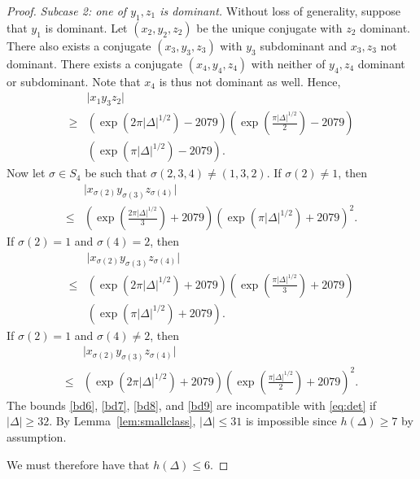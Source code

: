 \documentclass[11pt,a4paper, british]{amsart}
\theoremstyle{definition}
\theoremstyle{remark}
\numberwithin{equation}{section}
\begin{document}
\begin{proof}
\textit{Subcase 2: one of $y_1, z_1$ is dominant.} Without loss of generality, suppose that $y_1$ is dominant. Let $(x_2, y_2, z_2)$ be the unique conjugate with $z_2$ dominant. There also exists a conjugate $(x_3, y_3, z_3)$ with $y_3$ subdominant and $x_3, z_3$ not dominant. There exists a conjugate $(x_4, y_4, z_4)$ with neither of $y_4, z_4$ dominant or subdominant. Note that $x_4$ is thus not dominant as well. Hence,
\begin{align}\label{bd6}
	&\lvert x_1 y_3 z_2 \rvert \nonumber\\
	\geq &(\exp(2 \pi \lvert \Delta \rvert^{1/2}) - 2079)\left(\exp\left(\frac{\pi \lvert \Delta \rvert^{1/2}}{2}\right) - 2079\right) \nonumber \\
	&(\exp(\pi \lvert \Delta \rvert^{1/2}) - 2079).
\end{align}
Now let $\sigma \in S_4$ be such that $\sigma(2, 3, 4) \neq (1, 3, 2)$. If $\sigma(2) \neq 1$, then
\begin{align}\label{bd7}
	&\lvert x_{\sigma(2)} y_{\sigma(3)} z_{\sigma(4)} \rvert \nonumber \\
	\leq &\left(\exp\left(\frac{2 \pi \lvert \Delta \rvert^{1/2}}{3}\right) + 2079\right)(\exp(\pi \lvert \Delta \rvert^{1/2}) + 2079)^2.
\end{align}
If $\sigma(2) = 1$ and $\sigma(4) = 2$, then
\begin{align}\label{bd8}
	&\lvert x_{\sigma(2)} y_{\sigma(3)} z_{\sigma(4)} \rvert \nonumber \\ 
	\leq &(\exp(2 \pi \lvert \Delta \rvert^{1/2}) + 2079)\left(\exp\left(\frac{\pi \lvert \Delta \rvert^{1/2}}{3}\right) + 2079\right) \nonumber \\
	&(\exp(\pi \lvert \Delta \rvert^{1/2}) + 2079).
\end{align}
If $\sigma(2) = 1$ and $\sigma(4) \neq 2$, then
\begin{align}\label{bd9}
	&\lvert x_{\sigma(2)} y_{\sigma(3)} z_{\sigma(4)} \rvert \nonumber \\
	\leq &(\exp(2 \pi \lvert \Delta \rvert^{1/2}) + 2079)\left(\exp\left(\frac{\pi \lvert \Delta \rvert^{1/2}}{2}\right) + 2079\right)^2.
\end{align}
The bounds \eqref{bd6}, \eqref{bd7}, \eqref{bd8}, and \eqref{bd9} are incompatible with \eqref{eq:det} if $\lvert \Delta \rvert \geq 32$. By Lemma~\ref{lem:smallclass}, $\lvert \Delta \rvert \leq 31$ is impossible since $h(\Delta) \geq 7$ by assumption.

We must therefore have that $h(\Delta) \leq 6$.
\end{proof}
\end{document}
